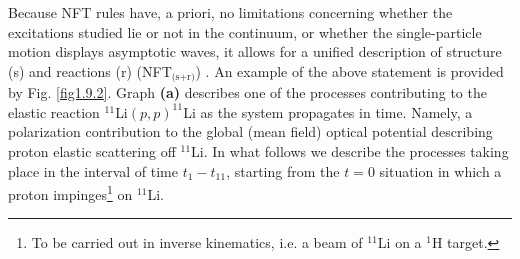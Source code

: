  Because NFT rules have, a priori,  no limitations concerning whether the excitations studied lie or not in the continuum, or whether the single-particle motion displays asymptotic waves, it allows for a unified description of structure (s) and reactions (r) (NFT$_{\text{(s+r)}}$) . An example of the above statement is provided by Fig. \ref{fig1.9.2}. Graph \textbf{(a)} describes  one of the processes contributing to the elastic
reaction $^{11}$Li$(p,p)^{11}$Li as the system propagates in time. Namely, a polarization contribution to
the global (mean field) optical potential describing proton elastic scattering off $^{11}$Li. 
In what follows we describe the processes taking place  in the interval of time $t_1-t_{11}$, starting from the $t=0$ situation in which a proton impinges\footnote{To be carried out in inverse kinematics, i.e. a beam of $^{11}$Li on a $^1$H target.} on $^{11}$Li.


